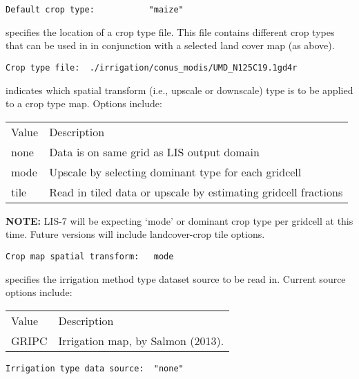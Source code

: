  \begin{Verbatim}[frame=single]
Default crop type:           "maize"   
 \end{Verbatim}

 
  specifies the location of a crop type file.
 This file contains different crop types that can be used in 
 in conjunction with a selected land cover map (as above).
 

 \begin{Verbatim}[frame=single]
Crop type file:  ./irrigation/conus_modis/UMD_N125C19.1gd4r
 \end{Verbatim}

 
  indicates which spatial transform
 (i.e., upscale or downscale) type is to be applied to a crop type
 map.  Options include:

 \begin{tabular}{ll}
 Value   & Description                                          \\
 none    & Data is on same grid as LIS output domain            \\
 mode    & Upscale by selecting dominant type for each gridcell \\
 tile    & Read in tiled data or upscale by estimating gridcell fractions \\
 \end{tabular}

 \textbf{NOTE:} LIS-7 will be expecting `mode' or dominant crop type per gridcell
    at this time. Future versions will include landcover-crop tile options.

 

 \begin{Verbatim}[frame=single]
Crop map spatial transform:   mode
 \end{Verbatim}


 
  specifies the irrigation method type 
 dataset source to be read in.
 Current source options include:

 \begin{tabular}{ll}
 Value       & Description               \\
 GRIPC       & Irrigation map, by Salmon (2013).  \\
 \end{tabular}
 

 \begin{Verbatim}[frame=single]
Irrigation type data source:  "none"
 \end{Verbatim}

